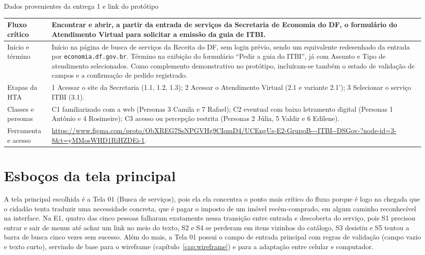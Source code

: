 \documentclass[
  12pt,
  oneside,
  a4paper,
  chapter=TITLE,
  section=TITLE,
  english,
  brazilian
]{abntex2}
\renewcommand{\fonte}[1]{\par\vspace{3pt}{\footnotesize\raggedright\noindent Fonte: #1\par}\vspace{4pt}}%
\newcommand{\autores}{Elaborado pelos autores (2026).}
\begin{document}
\begin{quadro}[!htbp]
  \caption{Dados provenientes da entrega 1 e link do protótipo}\label{qua:ficha}
  \centering\small
  \begin{tabularx}{\textwidth}{|P{3.6cm}|Y|}\hline
    Fluxo crítico & Encontrar e abrir, a partir da entrada de serviços da Secretaria de Economia do DF, o formulário do Atendimento Virtual para solicitar a emissão da guia de ITBI. \\\hline
    Início e término & Início na página de busca de serviços da Receita do DF, sem login prévio, sendo um equivalente redesenhado da entrada por \texttt{economia.df.gov.br}. Término na exibição do formulário ``Pedir a guia do ITBI'', já com Assunto e Tipo de atendimento selecionados. Como complemento demonstrativo no protótipo, incluíram-se também o estado de validação de campos e a confirmação de pedido registrado. \\\hline
    Etapas da HTA & 1 Acessar o site da Secretaria (1.1, 1.2, 1.3); 2 Acessar o Atendimento Virtual (2.1 e variante 2.1'); 3 Selecionar o serviço ITBI (3.1). \\\hline
    Classes e personas & C1 familiarizado com a web (Personas 3 Camila e 7 Rafael); C2 eventual com baixo letramento digital (Personas 1 Antônio e 4 Rosimeire); C3 acesso ou percepção restrita (Personas 2 Júlia, 5 Valdir e 6 Edilene). \\\hline
    Ferramenta e acesso & \url{https://www.figma.com/proto/ObXREG7SsNPGVHg9CIqmD4/UCEngUs-E2-GrupoB---ITBI--DSGov-?node-id=3-8&t=yMMosWHD1RiHZDEi-1}. \\\hline
  \end{tabularx}
  \fonte{\autores}
\end{quadro}\FloatBarrier

\chapter{Esboços da tela principal}\label{cap:esbocos}

A tela principal escolhida é a Tela 01 (Busca de serviços), pois ela ela concentra o ponto mais crítico do fluxo porque é logo na chegada que o
cidadão tenta traduzir uma necessidade concreta, que é pagar o imposto de um
imóvel recém-comprado, em algum caminho reconhecível na interface. Na E1,
quatro das cinco pessoas falharam exatamente nessa transição entre entrada e
descoberta do serviço, pois S1 precisou entrar e sair de menus até achar um link no
meio do texto, S2 e S4 se perderam em itens vizinhos do catálogo, S3 desistiu e S5 tentou a barra de busca cinco vezes sem
sucesso. Além do mais, a Tela 01 possui o campo de
entrada principal com regras de validação (campo vazio e texto curto), servindo
de base para o wireframe (capítulo~\ref{cap:wireframe}) e para a adaptação
entre celular e computador.
\end{document}
